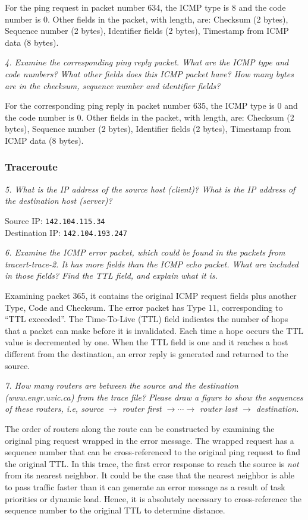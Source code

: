 For the ping request in packet number 634, the ICMP type is 8 and the code number is 0. Other fields in the packet, with length, are: Checksum (2 bytes), Sequence number (2 bytes), Identifier fields (2 bytes), Timestamp from ICMP data (8 bytes).

\pagebreak
\textit{4. Examine the corresponding ping reply packet. What are the ICMP type and code numbers? What other fields does this ICMP packet have? How many bytes are in the checksum, sequence number and identifier fields?}

For the corresponding ping reply in packet number 635, the ICMP type is 0 and the code number is 0. Other fields in the packet, with length, are: Checksum (2 bytes), Sequence number (2 bytes), Identifier fields (2 bytes), Timestamp from ICMP data (8 bytes).

\subsubsection{Traceroute}
\textit{5. What is the IP address of the source host (client)? What is the IP address of the destination host (server)?}

Source IP: \texttt{142.104.115.34} \\
Destination IP: \texttt{142.104.193.247}

\textit{6. Examine the ICMP error packet, which could be found in the packets from tracert-trace-2. It has more fields than the ICMP echo packet. What are included in those fields? Find the TTL field, and explain what it is.}

Examining packet 365, it contains the original ICMP request fields plus another Type, Code and Checksum. The error packet has Type 11, corresponding to ``TTL exceeded''. The Time-To-Live (TTL) field indicates the number of hops that a packet can make before it is invalidated. Each time a hope occurs the TTL value is decremented by one. When the TTL field is one and it reaches a host different from the destination, an error reply is generated and returned to the source.

\textit{7. How many routers are between the source and the destination (www.engr.uvic.ca) from the trace file? Please draw a figure to show the sequences of these routers, i.e, source $\rightarrow$ router first $\rightarrow \cdots \rightarrow$ router last $\rightarrow$ destination.}

The order of routers along the route can be constructed by examining the original ping request wrapped in the error message. The wrapped request has a sequence number that can be cross-referenced to the original ping request to find the original TTL. In this trace, the first error response to reach the source is \textit{not} from its nearest neighbor. It could be the case that the nearest neighbor is able to pass traffic faster than it can generate an error message as a result of task priorities or dynamic load.  Hence, it is absolutely necessary to cross-reference the sequence number to the original TTL to determine distance.

